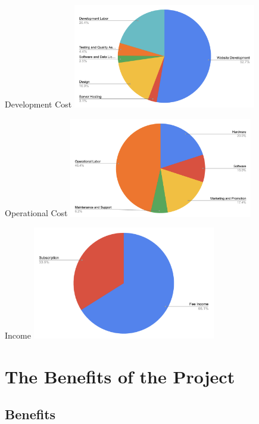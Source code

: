 \documentclass[aspectratio=169]{beamer}
\begin{document}
\begin{frame}{Development Cost}
    \centering
    \includegraphics[width=0.6\textwidth]{developmentcost.png}

\end{frame}

\begin{frame}{Operational Cost}
    \centering
    \includegraphics[width=0.6\textwidth]{OperationalCost.png}

\end{frame}

\begin{frame}{Income}
    \centering
    \includegraphics[width=0.6\textwidth]{Income.png}

\end{frame}

\section{The Benefits of the Project}
\subsection{Benefits}
\end{document}
